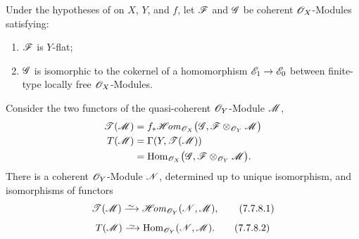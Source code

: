 \begin{corollary}[7.7.8]
\label{III.7.7.8}
Under the hypotheses of  on $X$, $Y$, and
$f$, let $\mathscr{F}$ and $\mathscr{G}$ be coherent
$\mathscr{O}_X$-Modules satisfying:
\begin{enumerate}
  \item[\textup{(i)}] $\mathscr{F}$ is $Y$-flat;
  \item[\textup{(ii)}] $\mathscr{G}$ is isomorphic to the cokernel of a
    homomorphism
    $\mathscr{E}_1\to\mathscr{E}_0$ between finite-type locally free
    $\mathscr{O}_X$-Modules.
\end{enumerate}
Consider the two functors of the quasi-coherent
$\mathscr{O}_Y$-Module $\mathscr{M}$,
\begin{align*}
  \mathscr{T}(\mathscr{M})
  &=
  f_*\mathscr{H}\!\mathit{om}_{\mathscr{O}_X}
  \bigl(
    \mathscr{G},
    \mathscr{F}\otimes_{\mathscr{O}_Y}\mathscr{M}
  \bigr)\\
  T(\mathscr{M})
  &=
  \Gamma(Y,\mathscr{T}(\mathscr{M}))\\
  &=
  \operatorname{Hom}_{\mathscr{O}_X}
  \bigl(
    \mathscr{G},
    \mathscr{F}\otimes_{\mathscr{O}_Y}\mathscr{M}
  \bigr).
\end{align*}
There is a coherent $\mathscr{O}_Y$-Module $\mathscr{N}$, determined
up to unique isomorphism, and isomorphisms of functors
\[
  \sh{T}(\sh{M})
  \simto
  \shHom_{\sh{O}_Y}(\sh{N},\sh{M}),
  \tag{7.7.8.1}\label{III.7.7.8.1}
\]
\[
  T(\sh{M})
  \simto
  \Hom_{\sh{O}_Y}(\sh{N},\sh{M}).
  \tag{7.7.8.2}\label{III.7.7.8.2}
\]
\end{corollary}

